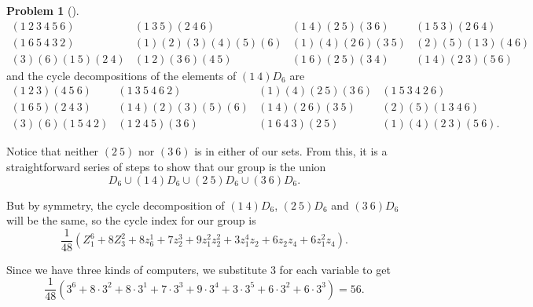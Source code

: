 \documentclass[10pt,]{book}
\theoremstyle{plain}
\theoremstyle{definition}
\newtheorem{activity}[project]{Problem}
\theoremstyle{definition}
\numberwithin{equation}{chapter}
\newcommand{\amp}{&}
\begin{document}
\begin{activity}[]
\begin{equation*}
\begin{array}{cccc}
(1\ 2\ 3\ 4\ 5\ 6)\amp (1\ 3\ 5)(2\ 4\ 6)\amp (1\ 4)(2\ 5)(3 \ 6)\amp  (1\ 5\ 3)(2\ 6\ 4)\\(1\ 6\ 5\ 4\
3\ 2)\amp (1)(2)(3)(4)(5)(6)\amp (1)(4)(2\ 6)(3\ 5)\amp (2)(5)(1\ 3)(4\ 6)\\
(3)(6)(1\ 5)(2\ 4)\amp (1\ 2)(3\ 6)(4\ 5)\amp (1\ 6)(2\ 5)(3\ 4)\amp (1\ 4)(2\ 3)(5\ 6)
\end{array}
\end{equation*}
and the cycle decompositions of the elements of \((1\ 4)D_6\) are%
\begin{equation*}
\begin{array}{cccc}
(1\ 2\ 3) (4\ 5\ 6)\amp (1\ 3\ 5\ 4\ 6\ 2)\amp (1) (4)(2\ 5)(3 \ 6)\amp  (1\ 5\ 3\ 4\ 2\ 6)\\(1\ 6\
5)(2\ 4\ 3)\amp (1\ 4)(2)(3)(5)(6)\amp (1\ 4)(2\ 6)(3\ 5)\amp (2)(5)(1\ 3\ 4\ 6)\\
(3)(6)(1\ 5\ 4\ 2)\amp (1\ 2\ 4\ 5)(3\ 6)\amp (1\ 6\ 4\ 3)(2\ 5)\amp (1)(4)(2\ 3)(5\ 6).
\end{array}
\end{equation*}
%
\par
Notice that neither \((2\ 5)\) nor \((3\ 6)\) is in either of our sets. From this, it is a straightforward series of steps to show that our group is the union%
\begin{equation*}
D_6\cup (1\ 4)D_6 \cup(2\ 5)D_6 \cup (3\ 6)D_6.
\end{equation*}
%
\par
But by symmetry, the cycle decomposition of \((1\ 4)D_6\), \((2\ 5)D_6\) and \((3\ 6)D_6\) will be the same, so the cycle index for our group is%
\begin{equation*}
\frac{1}{48} \left(Z^6_1 + 8Z^2_3
+8z_6^1 +7z_2^3+9z_1^2z_2^2 +3z_1^4z_2+
6z_2z_4+6z_1^2z_4\right)\text{.}
\end{equation*}
%
\par
Since we have three kinds of computers, we substitute 3 for each variable to get%
\begin{equation*}
\frac{1}{48} \left(3^6 + 8\cdot3^2
+8\cdot3^1 +7\cdot3^3+9\cdot3^4 +3\cdot3^5+
6\cdot3^2+6\cdot3^3\right)=56\text{.}
\end{equation*}
%
\end{activity}
\end{document}
